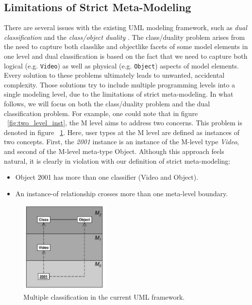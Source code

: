 \subsection{Limitations of Strict Meta-Modeling}

There are several issues with the existing UML modeling framework, such as \textit{dual classification} and the \textit{class/object duality} \cite{RearchitectingUML}. The class/duality problem arises from the need to capture both classlike and objectlike facets of some model elements in one level and dual classification is based on the fact that we need to capture both logical (e.g. \texttt{Video}) as well as physical (e.g. \texttt{Object}) aspects of model elements. Every solution to these problems ultimately leads to unwanted, accidental complexity. Those solutions try to include multiple programming levels into a single modeling level, due to the limitations of strict meta-modeling. In what follows, we will focus on both the class/duality problem and the dual classification problem. For example, one could note that in figure ~\ref{fig:two_level_inst}, the M level aims to address two concerns. This problem is denoted in figure ~\ref{fig:multiple_class_mm}. Here, user types at the M level are defined as instances of two concepts. First, the \textit{2001} instance is an instance of the M-level type \textit{Video}, and second of the M-level meta-type Object. Although this approach feels natural, it is clearly in violation with our definition of strict meta-modeling:

\begin{itemize}
\item{Object 2001 has more than one classifier (Video and Object).}
\item{An instance-of relationship crosses more than one meta-level boundary.}
\end{itemize}

\begin{figure}[h!]
\centering
\includegraphics[width=0.4\textwidth]{images/chap2_multiple_class_uml.png}
\caption{Multiple classification in the current UML framework.}
\label{fig:multiple_class_mm}
\end{figure}

